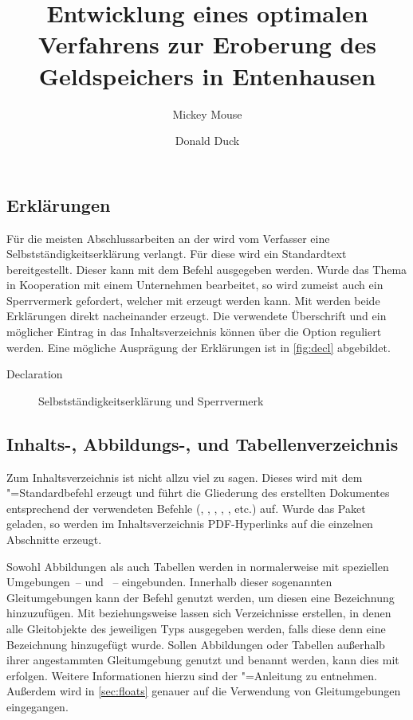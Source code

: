 \documentclass[%
  english,ngerman,%
  geometry=no,DIV=12,automark,%
]{tudscrartcl}
\begin{document}
\subsection{Erklärungen}
Für die meisten Abschlussarbeiten an der \TnUD wird vom Verfasser eine 
Selbstständigkeitserklärung verlangt. Für diese wird ein Standardtext 
bereitgestellt. Dieser kann mit dem Befehl  ausgegeben 
werden. Wurde das Thema in Kooperation mit einem Unternehmen bearbeitet, so 
wird zumeist auch ein Sperrvermerk gefordert, welcher mit  
erzeugt werden kann. Mit  werden beide Erklärungen direkt 
nacheinander erzeugt. Die verwendete Überschrift und ein möglicher Eintrag in 
das Inhaltsverzeichnis können über die Option  reguliert 
werden. Eine mögliche Ausprägung der Erklärungen ist in \autoref{fig:decl} 
abgebildet.
%
\begin{Excerpt!}{Declaration}
\title{%
  Entwicklung eines optimalen Verfahrens zur Eroberung des
  Geldspeichers in Entenhausen
}
\author{Mickey Mouse\and Donald Duck}
\declaration[company=FIRMA]
\end{Excerpt!}
%
\begin{figure}
\centering
{}
\caption{Selbstständigkeitserklärung und Sperrvermerk}
\label{fig:decl}
\end{figure}


\subsection{Inhalts-, Abbildungs-, und Tabellenverzeichnis}
Zum Inhaltsverzeichnis ist nicht allzu viel zu sagen. Dieses wird mit dem
"=Standardbefehl  erzeugt und führt die 
Gliederung des erstellten Dokumentes entsprechend der verwendeten Befehle 
(, , , , 
,  etc.) auf. Wurde das Paket  
geladen, so werden im Inhaltsverzeichnis PDF-Hyperlinks auf die einzelnen 
Abschnitte erzeugt.

Sowohl Abbildungen als auch Tabellen werden in  normalerweise mit 
speziellen Umgebungen~--  und ~-- 
eingebunden. Innerhalb dieser sogenannten Gleitumgebungen kann der Befehl 
 genutzt 
werden, um diesen eine Bezeichnung hinzuzufügen. Mit  
beziehungsweise  lassen sich Verzeichnisse erstellen, in 
denen alle Gleitobjekte des jeweiligen Typs ausgegeben werden, falls diese denn 
eine Bezeichnung hinzugefügt wurde. Sollen Abbildungen oder Tabellen außerhalb 
ihrer angestammten Gleitumgebung genutzt und benannt werden, kann dies mit
erfolgen. Weitere Informationen hierzu sind der \KOMAScript"=Anleitung 
\scrguide zu entnehmen. Außerdem wird in \autoref{sec:floats} genauer auf die 
Verwendung von Gleitumgebungen eingegangen.
%
\begin{Excerpt*}
\tableofcontents
\listoffigures
\listoftables
\clearpage
\end{Excerpt*}
\end{document}
